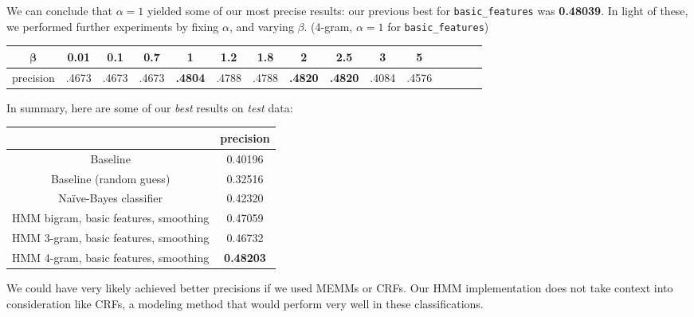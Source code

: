 \documentclass{article}
\begin{document}
We can conclude that $\alpha = 1$ yielded some of our most precise results: our previous best for \texttt{basic\_features} was \textbf{0.48039}. In light of these, we performed further experiments by fixing $\alpha$, and varying $\beta$. (4-gram, $\alpha = 1$ for \texttt{basic\_features})\par\bigskip

{\small\begin{tabular}{|c|c|c|c|c|c|c|c|c|c|c|c|c|c|c|}\hline
$\bm{\beta}$ & 0.01 & 0.1 & 0.7 & 1 & 1.2 & 1.8 & 2 & 2.5 & 3 & 5\\\hline
precision & .4673 & .4673 & .4673 & \textbf{.4804} & .4788 & .4788
& \textbf{.4820} & \textbf{.4820} & .4084 & .4576\\\hline
\end{tabular}}\par\bigskip

In summary, here are some of our \emph{best} results on \emph{test} data:\par\bigskip
\begin{tabular}{|c|c|}\hline
                           & precision\\\hline
Baseline                   & 0.40196\\
Baseline (random guess)    & 0.32516\\
Na\"{i}ve-Bayes classifier & 0.42320\\
HMM bigram, basic features, smoothing & 0.47059\\
HMM 3-gram, basic features, smoothing & 0.46732\\
HMM 4-gram, basic features, smoothing & \textbf{0.48203}\\\hline
\end{tabular}\par\medskip

We could have very likely achieved better precisions if we used MEMMs or CRFs. Our HMM implementation does not take context into consideration like CRFs, a modeling method that would perform very well in these classifications.
\end{document}
